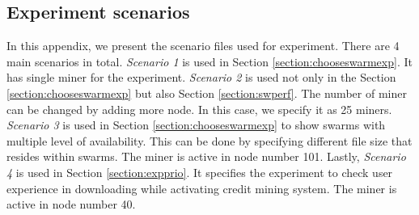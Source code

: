 \begin{appendices}
\chapter{Experiment scenarios}
\label{app:expscenario}

In this appendix, we present the scenario files used for experiment. There are 4 main scenarios in total. \textit{Scenario 1} is used in Section \ref{section:chooseswarmexp}. It has single miner for the experiment. \textit{Scenario 2} is used not only in the Section \ref{section:chooseswarmexp} but also Section \ref{section:swperf}. The number of miner can be changed by adding more node. In this case, we specify it as 25 miners. \textit{Scenario 3} is used in Section \ref{section:chooseswarmexp} to show swarms with multiple level of availability. This can be done by specifying different file size that resides within swarms. The miner is active in node number 101.  Lastly, \textit{Scenario 4} is used in Section \ref{section:expprio}. It specifies the experiment to check user experience in downloading while activating credit mining system. The miner is active in node number 40. 


\end{appendices}
